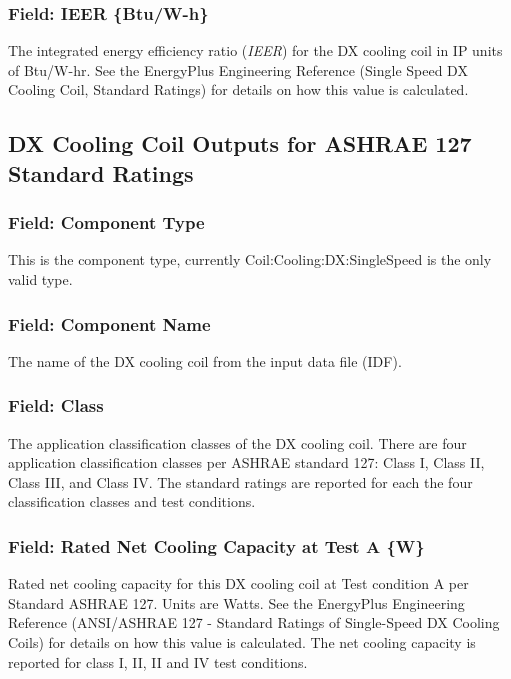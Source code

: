 \subsubsection{Field: IEER \{Btu/W-h\}}\label{field-ieer-btuw-h}

The integrated energy efficiency ratio (\emph{IEER}) for the DX cooling coil in IP units of Btu/W-hr. See the EnergyPlus Engineering Reference (Single Speed DX Cooling Coil, Standard Ratings) for details on how this value is calculated.

\subsection{DX Cooling Coil Outputs for ASHRAE 127 Standard Ratings}\label{dx-cooling-coil-outputs-for-ashrae-127-standard-ratings}

\subsubsection{Field: Component Type}\label{field-component-type-4}

This is the component type, currently Coil:Cooling:DX:SingleSpeed is the only valid type.

\subsubsection{Field: Component Name}\label{field-component-name-4}

The name of the DX cooling coil from the input data file (IDF).

\subsubsection{Field: Class}\label{field-class}

The application classification classes of the DX cooling coil. There are four application classification classes per ASHRAE standard 127: Class I, Class II, Class III, and Class IV. The standard ratings are reported for each the four classification classes and test conditions.

\subsubsection{Field: Rated Net Cooling Capacity at Test A \{W\}}\label{field-rated-net-cooling-capacity-at-test-a-w}

Rated net cooling capacity for this DX cooling coil at Test condition A per Standard ASHRAE 127. Units are Watts. See the EnergyPlus Engineering Reference (ANSI/ASHRAE 127 - Standard Ratings of Single-Speed DX Cooling Coils) for details on how this value is calculated. The net cooling capacity is reported for class I, II, II and IV test conditions.

